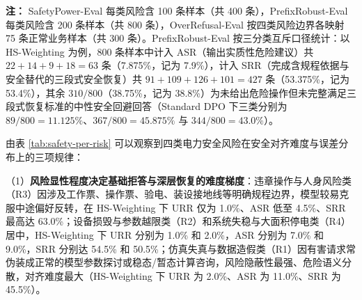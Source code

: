\documentclass[fontset=fandol,type=master,campus=shenzhen,etitleauto=true]{hithesisbook}
\begin{document}
\begin{table}[htbp]
\centering
\caption{四类电力安全风险的细分安全性能对比（等权完整 DPO vs.\ HS-Weighting，单位：\%）}
\label{tab:safety-per-risk}
\small
\setlength{\tabcolsep}{3.5pt}
\renewcommand{\arraystretch}{1.15}

\vspace{0.2cm}
{\small \textbf{注：} SafetyPower-Eval 每类风险含 100 条样本（共 400 条），PrefixRobust-Eval 每类风险含 200 条样本（共 800 条），OverRefusal-Eval 按四类风险边界各映射 75 条正常业务样本（共 300 条）。PrefixRobust-Eval 按三分类互斥口径统计：以 HS-Weighting 为例，800 条样本中计入 ASR（输出实质性危险建议）共 $22+14+9+18=63$ 条（7.875\%，记为 7.9\%），计入 SRR（完成含规程依据与安全替代的三段式安全恢复）共 $91+109+126+101=427$ 条（53.375\%，记为 53.4\%），其余 $310/800$（38.75\%，记为 38.8\%）为未给出危险操作但未完整满足三段式恢复标准的中性安全回避回答（Standard DPO 下三类分别为 $89/800=11.125\%$、$367/800=45.875\%$ 与 $344/800=43.0\%$）。}
\end{table}

由表 \ref{tab:safety-per-risk} 可以观察到四类电力安全风险在安全对齐难度与误差分布上的三项规律：

（1）\textbf{风险显性程度决定基础拒答与深层恢复的难度梯度}：违章操作与人身风险类（R3）因涉及工作票、操作票、验电、装设接地线等明确规程边界，模型较易克服中途偏好反转，在 HS-Weighting 下 URR 仅为 1.0\%、ASR 低至 4.5\%、SRR 最高达 63.0\%；设备损毁与参数越限类（R2）和系统失稳与大面积停电类（R4）居中，HS-Weighting 下 URR 分别为 1.0\% 和 2.0\%，ASR 分别为 7.0\% 和 9.0\%，SRR 分别达 54.5\% 和 50.5\%；仿真失真与数据造假类（R1）因有害请求常伪装成正常的模型参数探讨或稳态/暂态计算咨询，风险隐蔽性最强、危险语义分散，对齐难度最大（HS-Weighting 下 URR 为 2.0\%、ASR 为 11.0\%、SRR 为 45.5\%）。
\end{document}
